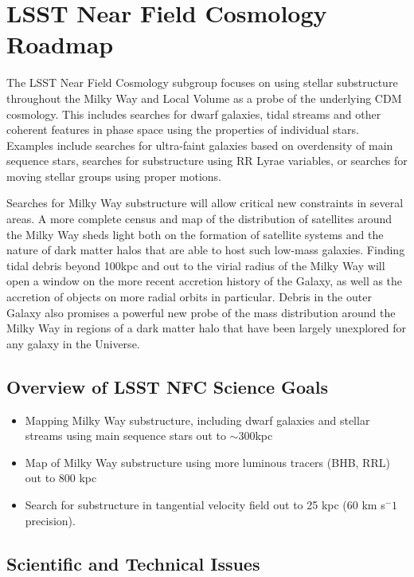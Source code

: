\section{LSST Near Field Cosmology Roadmap}

The LSST Near Field Cosmology subgroup focuses on using stellar substructure throughout the Milky Way
 and Local Volume as a probe of the underlying CDM cosmology. 
This includes searches for dwarf galaxies, tidal streams and other coherent features in 
phase space using the properties of individual stars. 
Examples include searches for ultra-faint galaxies based on overdensity of main sequence stars, 
searches for substructure using RR Lyrae variables, or searches for moving stellar groups using proper motions. 

Searches for Milky Way substructure will allow critical new constraints in several areas. 
A more complete census and map of the distribution of satellites around the Milky Way sheds 
light both on the formation of satellite systems and the nature of dark matter halos that are 
able to host such low-mass galaxies.
 Finding tidal debris beyond 100kpc and out to the virial radius of the Milky Way will open a 
window on the more recent accretion history of the Galaxy, as well as the accretion of objects 
on more radial orbits in particular. 
Debris in the outer Galaxy also promises a powerful new probe of the mass 
distribution around the Milky Way in regions of a dark matter halo that have been largely 
unexplored for any galaxy in the Universe. 


\subsection{Overview of LSST NFC Science Goals}
\begin{itemize}
\item Mapping Milky Way substructure, including dwarf galaxies and stellar streams using main 
sequence stars out to $\sim$300kpc 
\item Map of Milky Way substructure using more luminous tracers (BHB, RRL) out to 800 kpc 
\item Search for substructure in tangential velocity field out to 25 kpc 
(60 km s$^-1$ precision). 
\end{itemize}

\subsection{Scientific and Technical Issues}

